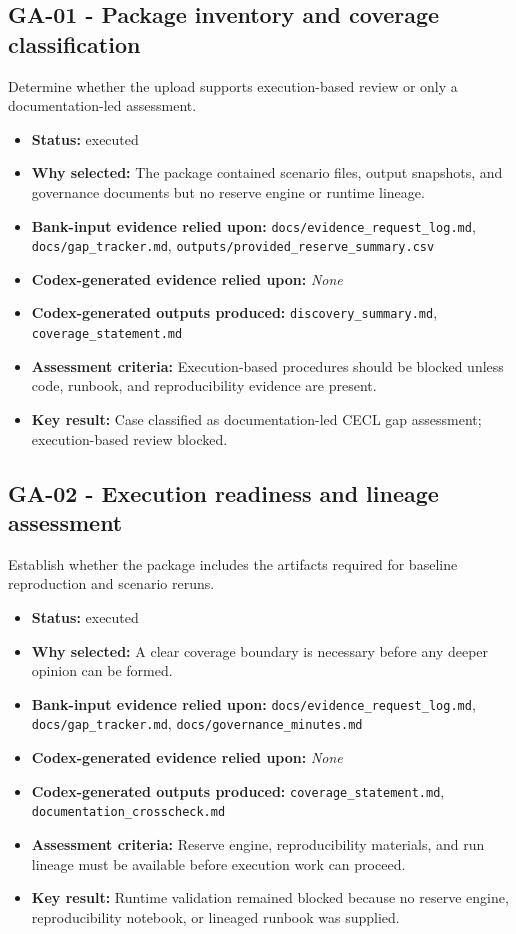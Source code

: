 \documentclass[11pt]{article}
\begin{document}
\subsection*{GA-01 - Package inventory and coverage classification}
Determine whether the upload supports execution-based review or only a documentation-led assessment.
\begin{itemize}
\item \textbf{Status:} executed
\item \textbf{Why selected:} The package contained scenario files, output snapshots, and governance documents but no reserve engine or runtime lineage.
\item \textbf{Bank-input evidence relied upon:} \texttt{docs/evidence\_request\_log.md}, \texttt{docs/gap\_tracker.md}, \texttt{outputs/provided\_reserve\_summary.csv}
\item \textbf{Codex-generated evidence relied upon:} \textit{None}
\item \textbf{Codex-generated outputs produced:} \texttt{discovery\_summary.md}, \texttt{coverage\_statement.md}
\item \textbf{Assessment criteria:} Execution-based procedures should be blocked unless code, runbook, and reproducibility evidence are present.
\item \textbf{Key result:} Case classified as documentation-led CECL gap assessment; execution-based review blocked.
\end{itemize}
\subsection*{GA-02 - Execution readiness and lineage assessment}
Establish whether the package includes the artifacts required for baseline reproduction and scenario reruns.
\begin{itemize}
\item \textbf{Status:} executed
\item \textbf{Why selected:} A clear coverage boundary is necessary before any deeper opinion can be formed.
\item \textbf{Bank-input evidence relied upon:} \texttt{docs/evidence\_request\_log.md}, \texttt{docs/gap\_tracker.md}, \texttt{docs/governance\_minutes.md}
\item \textbf{Codex-generated evidence relied upon:} \textit{None}
\item \textbf{Codex-generated outputs produced:} \texttt{coverage\_statement.md}, \texttt{documentation\_crosscheck.md}
\item \textbf{Assessment criteria:} Reserve engine, reproducibility materials, and run lineage must be available before execution work can proceed.
\item \textbf{Key result:} Runtime validation remained blocked because no reserve engine, reproducibility notebook, or lineaged runbook was supplied.
\end{itemize}
\end{document}
